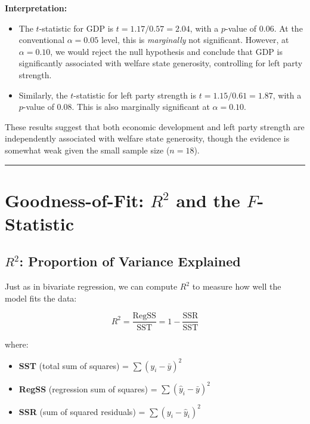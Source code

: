 \documentclass[
  letterpaper,
  DIV=11,
  numbers=noendperiod]{scrreprt}
\providecommand{\tightlist}{%
  \setlength{\itemsep}{0pt}\setlength{\parskip}{0pt}}
\begin{document}
\textbf{Interpretation:}

\begin{itemize}
\item
  The \(t\)-statistic for GDP is \(t = 1.17 / 0.57 = 2.04\), with a
  \(p\)-value of 0.06. At the conventional \(\alpha = 0.05\) level, this
  is \emph{marginally} not significant. However, at \(\alpha = 0.10\),
  we would reject the null hypothesis and conclude that GDP is
  significantly associated with welfare state generosity, controlling
  for left party strength.
\item
  Similarly, the \(t\)-statistic for left party strength is
  \(t = 1.15 / 0.61 = 1.87\), with a \(p\)-value of 0.08. This is also
  marginally significant at \(\alpha = 0.10\).
\end{itemize}

These results suggest that both economic development and left party
strength are independently associated with welfare state generosity,
though the evidence is somewhat weak given the small sample size
(\(n = 18\)).

\begin{center}\rule{0.5\linewidth}{0.5pt}\end{center}

\section{\texorpdfstring{Goodness-of-Fit: \(R^2\) and the
\(F\)-Statistic}{Goodness-of-Fit: R\^{}2 and the F-Statistic}}\label{goodness-of-fit-r2-and-the-f-statistic}

\subsection{\texorpdfstring{\(R^2\): Proportion of Variance
Explained}{R\^{}2: Proportion of Variance Explained}}\label{r2-proportion-of-variance-explained}

Just as in bivariate regression, we can compute \(R^2\) to measure how
well the model fits the data:

\[
R^2 = \frac{\text{RegSS}}{\text{SST}} = 1 - \frac{\text{SSR}}{\text{SST}}
\]

where:

\begin{itemize}
\tightlist
\item
  \textbf{SST} (total sum of squares) = \(\sum (y_i - \bar{y})^2\)
\item
  \textbf{RegSS} (regression sum of squares) =
  \(\sum (\hat{y}_i - \bar{y})^2\)
\item
  \textbf{SSR} (sum of squared residuals) = \(\sum (y_i - \hat{y}_i)^2\)
\end{itemize}
\end{document}
